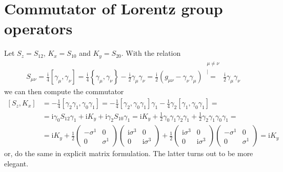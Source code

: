 \documentclass[english, parskip=full]{scrartcl}
\newcommand{\kom}{}
\newcommand{\kla}{}
\newcommand{\klam}{}
\newcommand{\klammer}{}
\def\I{\text{i}}
\begin{document}
\section{Commutator of Lorentz group operators}
Let $S_z=S_{12}$, $K_x=S_{10}$ and $K_y=S_{20}$. With the relation
\begin{align*}
S_{\mu\nu}=\frac{\I}{4}\klam\left[ {\gamma_\mu,\gamma_\nu} \right]=\frac{\I}{4}\klammer\left\{{\gamma_\mu,\gamma_\nu} \right\}-\frac{\I}{2}\gamma_\mu\gamma_\nu=\frac{\I}{2}\kla\left( {g_{\mu\nu}-\gamma_\nu\gamma_\mu} \right)\kom\overset{\substack{{\mu\neq\nu} \\ |}}{=}\frac{\I}{2}\gamma_\mu\gamma_\nu
\end{align*}
we can then compute the commutator 
\begin{align*}
\klam\left[ {S_z,K_x} \right]&=-\frac{1}{4}\klam\left[ {\gamma_2\gamma_1,\gamma_0\gamma_1} \right]=-\frac{1}{4}\klam\left[ {\gamma_2,\gamma_0\gamma_1} \right]\gamma_1-\frac{1}{4}\gamma_2\klam\left[ {\gamma_1,\gamma_0\gamma_1} \right]=\\
&=\I\gamma_0S_{12}\gamma_1+\I K_y+\I\gamma_2S_{10}\gamma_1=\I K_y+\frac{1}{2}\gamma_0\gamma_1\gamma_2\gamma_1+\frac{1}{2}\gamma_2\gamma_1\gamma_0\gamma_1=\\
&=\I K_y +\frac{1}{2}\begin{pmatrix}
-\sigma^1&0 \\ 0&\sigma^1
\end{pmatrix}\begin{pmatrix}
\I\sigma^3&0 \\ 0&\I\sigma^3
\end{pmatrix}+\frac{1}{2}\begin{pmatrix}
\I\sigma^3&0 \\ 0&\I\sigma^3
\end{pmatrix}\begin{pmatrix}
-\sigma^1&0 \\ 0&\sigma^1
\end{pmatrix}=\I K_y
\end{align*}
or, do the same in explicit matrix formulation. The latter  turns out to be more elegant.
\end{document}
